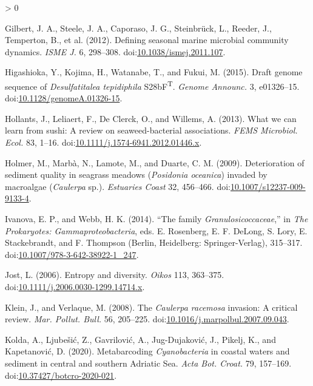 \documentclass[
  12pt,
]{article}
\newlength{\cslhangindent}
\newenvironment{CSLReferences}[2] %
 {%
  \setlength{\parindent}{0pt}
  \ifodd #1 \everypar{\setlength{\hangindent}{\cslhangindent}}\ignorespaces\fi
  \ifnum #2 > 0
  \setlength{\parskip}{#2\baselineskip}
  \fi
 }%
 {}
\begin{document}
\begin{CSLReferences}{1}{0}
\leavevmode\hypertarget{ref-Gilbert2012}{}%
Gilbert, J. A., Steele, J. A., Caporaso, J. G., Steinbrück, L., Reeder,
J., Temperton, B., et al. (2012). Defining seasonal marine microbial
community dynamics. \emph{ISME J.} 6, 298--308.
doi:\href{https://doi.org/10.1038/ismej.2011.107}{10.1038/ismej.2011.107}.

\leavevmode\hypertarget{ref-Higashioka2015}{}%
Higashioka, Y., Kojima, H., Watanabe, T., and Fukui, M. (2015). Draft
genome sequence of {\emph{Desulfatitalea tepidiphila}}
{S28bF}{\textsuperscript{T}}. \emph{Genome Announc.} 3, e01326--15.
doi:\href{https://doi.org/10.1128/genomeA.01326-15}{10.1128/genomeA.01326-15}.

\leavevmode\hypertarget{ref-Hollants2013}{}%
Hollants, J., Leliaert, F., De Clerck, O., and Willems, A. (2013). What
we can learn from sushi: A review on seaweed-bacterial associations.
\emph{FEMS Microbiol. Ecol.} 83, 1--16.
doi:\href{https://doi.org/10.1111/j.1574-6941.2012.01446.x}{10.1111/j.1574-6941.2012.01446.x}.

\leavevmode\hypertarget{ref-Holmer2009}{}%
Holmer, M., Marbà, N., Lamote, M., and Duarte, C. M. (2009).
Deterioration of sediment quality in seagrass meadows ({\emph{Posidonia
oceanica}}) invaded by macroalgae ({\emph{Caulerpa}} sp.).
\emph{Estuaries Coast} 32, 456--466.
doi:\href{https://doi.org/10.1007/s12237-009-9133-4}{10.1007/s12237-009-9133-4}.

\leavevmode\hypertarget{ref-Ivanova2014}{}%
Ivanova, E. P., and Webb, H. K. (2014). {``The family
{\emph{Granulosicoccaceae}},''} in \emph{The {Prokaryotes}:
{Gammaproteobacteria}}, eds. E. Rosenberg, E. F. DeLong, S. Lory, E.
Stackebrandt, and F. Thompson ({Berlin, Heidelberg}: {Springer-Verlag}),
315--317.
doi:\href{https://doi.org/10.1007/978-3-642-38922-1_247}{10.1007/978-3-642-38922-1\_247}.

\leavevmode\hypertarget{ref-Jost2006}{}%
Jost, L. (2006). Entropy and diversity. \emph{Oikos} 113, 363--375.
doi:\href{https://doi.org/10.1111/j.2006.0030-1299.14714.x}{10.1111/j.2006.0030-1299.14714.x}.

\leavevmode\hypertarget{ref-Klein2008}{}%
Klein, J., and Verlaque, M. (2008). The {\emph{Caulerpa racemosa}}
invasion: A critical review. \emph{Mar. Pollut. Bull.} 56, 205--225.
doi:\href{https://doi.org/10.1016/j.marpolbul.2007.09.043}{10.1016/j.marpolbul.2007.09.043}.

\leavevmode\hypertarget{ref-Kolda2020}{}%
Kolda, A., Ljubešić, Z., Gavrilović, A., Jug-Dujaković, J., Pikelj, K.,
and Kapetanović, D. (2020). Metabarcoding {\emph{Cyanobacteria}} in
coastal waters and sediment in central and southern {Adriatic Sea}.
\emph{Acta Bot. Croat.} 79, 157--169.
doi:\href{https://doi.org/10.37427/botcro-2020-021}{10.37427/botcro-2020-021}.


\end{CSLReferences}
\end{document}
